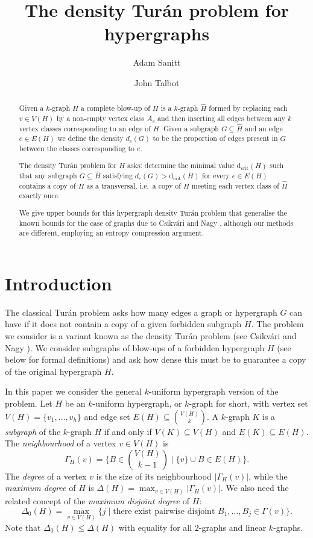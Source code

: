 \documentclass[12]{article}
\def\tr{\textrm}
\def\disj{0}
\def\dcrit{\tr{d}_{\tr{crit}}}
\begin{document}
\title{The density Tur\'an problem for hypergraphs}
\author{Adam Sanitt \and John Talbot}
\maketitle
\begin{abstract}
  \noindent
Given a $k$-graph $H$ a complete blow-up of $H$ is a $k$-graph $\hat{H}$ formed by replacing each $v\in V(H)$ by a non-empty vertex class $A_v$ and then inserting all edges between any $k$ vertex classes corresponding to an edge of $H$. Given a subgraph $G\subseteq \hat{H}$ and an edge $e\in E(H)$ we define the density $d_e(G)$ to be the proportion of edges present in $G$ between the classes corresponding to $e$.

The density Tur\'an problem for $H$ asks: determine the minimal value $\dcrit(H)$ such that any subgraph $G\subseteq \hat{H}$ satisfying $d_e(G)> \dcrit(H)$ for every $e\in E(H)$ contains a copy of $H$ as a transversal, i.e.~a copy of $H$ meeting each vertex  class of $\hat{H}$ exactly once.

  We give upper bounds for this hypergraph density Tur\'an problem that generalise the known bounds for the case of graphs due to Csikv\'ari and Nagy \cite{CsikvariNagy}, although our methods are different, employing an entropy compression argument.
\end{abstract}
\section{Introduction}
\label{sec:introduction}
The classical Tur\'an problem asks how many edges a graph or hypergraph $G$ can have if it does not contain a copy of a given forbidden subgraph $H$. The problem we consider is a variant known as the density Tur\'an problem (see Csikv\'ari and Nagy \cite{CsikvariNagy}). We consider subgraphs of blow-ups of a forbidden hypergraph $H$ (see below for formal definitions) and ask how dense this must be to guarantee a copy of the original hypergraph $H$.

In this paper we consider the general $k$-uniform hypergraph version of the problem. Let $H$ be an $k$-uniform hypergraph, or $k$-graph for short, with vertex set $V(H)=\{v_1,\ldots,v_h\}$ and edge set $E(H)\subseteq \binom{V(H)}{k}$. A $k$-graph $K$ is a \emph{subgraph} of the $k$-graph $H$ if and only if $V(K)\subseteq V(H)$ and $E(K)\subseteq E(H)$. The \emph{neighbourhood} of a vertex $v\in V(H)$ is \[\Gamma_H(v)=\{B\in \binom{V(H)}{k-1}\mid \{v\}\cup B\in E(H)\}.\] The \emph{degree} of a vertex $v$ is the size of its neighbourhood $|\Gamma_H(v)|$, while the \emph{maximum degree} of $H$ is $\Delta(H)=\max_{v\in V(H)}|\Gamma_H(v)|$. We also need the related concept of the \emph{maximum disjoint degree} of $H$: \[
\Delta_\disj(H)=\max_{v\in V(H)}\{j\mid \tr{there exist pairwise disjoint $B_1,\ldots, B_j\in \Gamma(v)$}\}.\]Note that $\Delta_\disj(H)\leq\Delta(H)$ with equality for all $2$-graphs and linear $k$-graphs.
\end{document}

